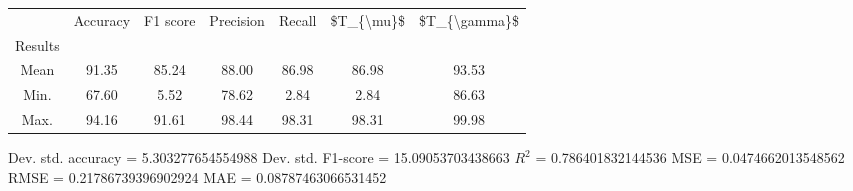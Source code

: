 \begin{tabular}{|c|c|c|c|c|c|c|}
\toprule
{} &  Accuracy &  F1 score &  Precision &  Recall &  \$T\_\{\textbackslash mu\}\$ &  \$T\_\{\textbackslash gamma\}\$ \\
Results &           &           &            &         &            &               \\
\hline
Mean    &     91.35 &     85.24 &      88.00 &   86.98 &      86.98 &         93.53 \\
Min.    &     67.60 &      5.52 &      78.62 &    2.84 &       2.84 &         86.63 \\
Max.    &     94.16 &     91.61 &      98.44 &   98.31 &      98.31 &         99.98 \\
\bottomrule
\end{tabular}

 Dev. std. accuracy = 5.303277654554988
 Dev. std. F1-score = 15.09053703438663
 $R^2$ = 0.786401832144536
 MSE = 0.0474662013548562
 RMSE = 0.21786739396902924
 MAE = 0.08787463066531452